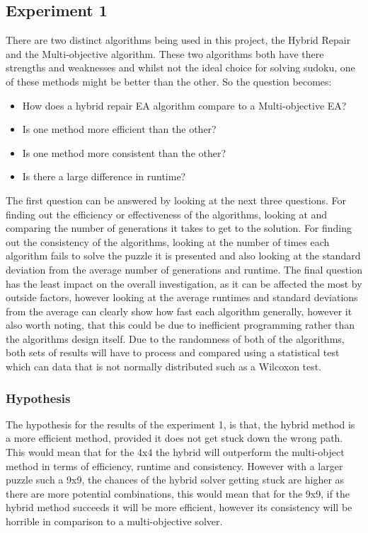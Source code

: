 \documentclass[a4paper,11pt]{article}
\begin{document}
\subsection{Experiment 1}
There are two distinct algorithms being used in this project, the Hybrid Repair and the Multi-objective algorithm. These two algorithms both have there strengths and weaknesses and whilst not the ideal choice for solving sudoku, one of these methods might be better than the other. So the question becomes: 
\begin{itemize} 
	\item How does a hybrid repair EA algorithm compare to a Multi-objective EA? 
	\item Is one method more efficient than the other?
	\item Is one method more consistent than the other?
	\item Is there a large difference in runtime?
\end{itemize}
The first question can be answered by looking at the next three questions. For finding out the efficiency or effectiveness of the algorithms, looking at and comparing the number of generations it takes to get to the solution.  For finding out the consistency of the algorithms, looking at the number of times each algorithm fails to solve the puzzle it is presented and also looking at the standard deviation from the average number of generations and runtime. \newline \newline The final question has the least impact on the overall investigation, as it can be affected the most by outside factors, however looking at the average runtimes and standard deviations from the average can clearly show how fast each algorithm generally, however it also worth noting, that this could be due to inefficient programming rather than the algorithms design itself. Due to the randomness of both of the algorithms, both sets of results will have to process and compared using a statistical test which can data that is not normally distributed such as a Wilcoxon test.
\subsubsection{Hypothesis}
The hypothesis for the results of the experiment 1, is that, the hybrid method is a more efficient method, provided it does not get stuck down the wrong path. This would mean that for the 4x4 the hybrid will outperform the multi-object method in terms of efficiency, runtime and consistency. However with a larger puzzle such a 9x9, the chances of the hybrid solver getting stuck are higher as there are more potential combinations, this would mean that for the 9x9, if the hybrid method succeeds it will be more efficient, however its consistency will be horrible in comparison to a multi-objective solver. 
\end{document}

